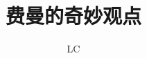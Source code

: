 \documentclass{beamer}
\begin{document}
\begin{CJK}{UTF8}{hei}
    \title{费曼的奇妙观点}
    \author{LC}

    \maketitle

    \begin{frame}[allowframebreaks]
        
    \end{frame}
\end{CJK}
\end{document}
